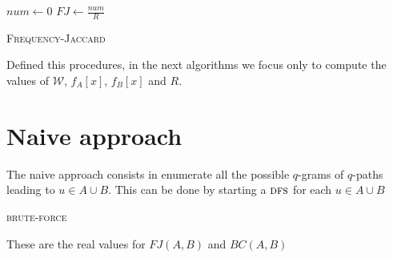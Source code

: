 \begin{algorithm}[h]
	\small
	\DontPrintSemicolon
	\BlankLine
	$num \gets 0$\;
	$FJ \gets \frac{num}{R}$\;
	\caption{\textsc{Frequency-Jaccard}}
	\label{alg:jaccard}
\end{algorithm}

Defined this procedures, in the next algorithms we focus only to compute the values of $\mathcal{W}$, $f_{A}[x]$, $f_{B}[x]$ and $R$.


\section{Naive approach}

	The naive approach consists in enumerate all the possible $q$-grams of $q$-paths leading to $u \in A \cup B$. 
	This can be done by starting a $\textsc{dfs}$ for each $u \in A \cup B$
	
    \begin{algorithm}[h]
    
    \small
    \DontPrintSemicolon
    \Output{\ }
    
    \BlankLine
    
    

    
    \caption{\textsc{brute-force}}
    
    \label{alg:brute-force}
    \end{algorithm}

	These are the real values for $FJ(A,B)$ and $BC(A,B)$ 
	
